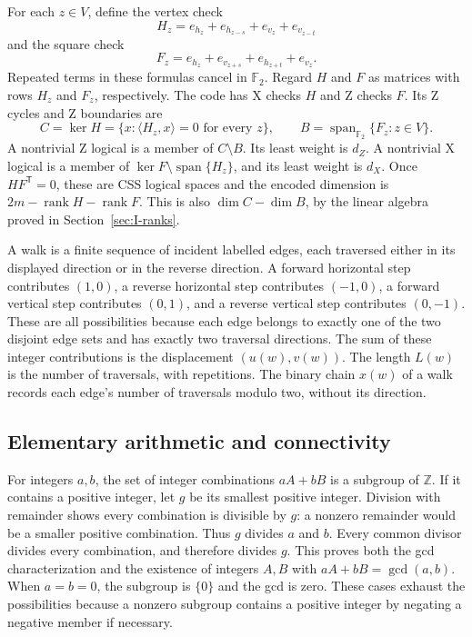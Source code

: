 \documentclass{article}
\numberwithin{equation}{section}
\begin{document}
For each \(z\in V\), define the vertex check
\begin{equation}\label{eq:vertex-check}
  H_z=e_{h_z}+e_{h_{z-s}}+e_{v_z}+e_{v_{z-t}}
\end{equation}
and the square check
\begin{equation}\label{eq:square-check}
  F_z=e_{h_z}+e_{v_{z+s}}+e_{h_{z+t}}+e_{v_z}.
\end{equation}
Repeated terms in these formulas cancel in \(\mathbb F_2\). Regard \(H\) and
\(F\) as matrices with rows \(H_z\) and \(F_z\), respectively. The code has X
checks \(H\) and Z checks \(F\). Its Z cycles and Z boundaries are
\begin{equation}\label{eq:cycles-boundaries}
  C=\ker H=\{x:\langle H_z,x\rangle=0\text{ for every }z\},\qquad
  B=\operatorname{span}_{\mathbb F_2}\{F_z:z\in V\}.
\end{equation}
A nontrivial Z logical is a member of \(C\setminus B\). Its least weight is
\(d_Z\). A nontrivial X logical is a member of
\(\ker F\setminus\operatorname{span}\{H_z\}\), and its least weight is \(d_X\).
Once \(HF^{\mathsf T}=0\), these are CSS logical spaces and the encoded
dimension is \(2m-\operatorname{rank}H-\operatorname{rank}F\). This is also
\(\dim C-\dim B\), by the linear algebra proved in Section~\ref{sec:I-ranks}.

A walk is a finite sequence of incident labelled edges, each traversed either
in its displayed direction or in the reverse direction. A forward horizontal
step contributes \((1,0)\), a reverse horizontal step contributes \((-1,0)\), a
forward vertical step contributes \((0,1)\), and a reverse vertical step
contributes \((0,-1)\). These are all possibilities because each edge belongs to
exactly one of the two disjoint edge sets and has exactly two traversal
directions. The sum of these integer contributions is the displacement
\((u(w),v(w))\). The length \(L(w)\) is the number of traversals, with
repetitions. The binary chain \(x(w)\) of a walk records each edge's number of
traversals modulo two, without its direction.

\subsection{Elementary arithmetic and connectivity}\label{sec:I-arith}

For integers \(a,b\), the set of integer combinations \(aA+bB\) is a subgroup
of \(\mathbb Z\). If it contains a positive integer, let \(g\) be its smallest
positive integer. Division with remainder shows every combination is divisible
by \(g\): a nonzero remainder would be a smaller positive combination. Thus
\(g\) divides \(a\) and \(b\). Every common divisor divides every combination,
and therefore divides \(g\). This proves both the gcd characterization and
the existence of integers \(A,B\) with \(aA+bB=\gcd(a,b)\). When \(a=b=0\),
the subgroup is \(\{0\}\) and the gcd is zero. These cases exhaust the
possibilities because a nonzero subgroup contains a positive integer by
negating a negative member if necessary.
\end{document}
